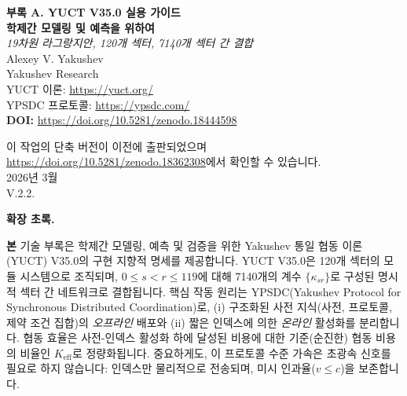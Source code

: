 \documentclass[13pt,a4paper]{article}
\newcommand{\Keff}{K_{\mathrm{eff}}}
\begin{document}
	
	\begin{titlepage}
		\begin{center}
			\vspace*{0.2cm}
			{\Huge\textbf{부록 A. 
					YUCT V35.0 실용 가이드\\
					학제간 모델링 및 예측을 위하여}}\\[0.8cm]
			
			{\Large\textit{19차원 라그랑지안, 120개 섹터, 7140개 섹터 간 결합}}\\[1.2cm]
			
			{\Large Alexey V. Yakushev}\\[0.3cm]
			{\large Yakushev Research}\\
			YUCT 이론: \url{https://yuct.org/}\\
			YPSDC 프로토콜: \url{https://ypsdc.com/}\\
			
			\vspace{2cm}
			\textbf{DOI:} \url{https://doi.org/10.5281/zenodo.18444598}\\
			
			\vspace{1cm}
			
			\vspace{0cm}
			\large 
			이 작업의 단축 버전이 이전에 출판되었으며\\ \url{https://doi.org/10.5281/zenodo.18362308}에서 확인할 수 있습니다.\\
			\vspace{1cm}
			2026년 3월 \\ \large V.2.2.
			
			\begin{minipage}{0.92\textwidth}
				\begin{center}\large\textbf{확장 초록.}\\
				\end{center}
				\large\textbf 본 기술 부록은 학제간 모델링, 예측 및 검증을 위한 Yakushev 통일 협동 이론(YUCT) V35.0의 구현 지향적 명세를 제공합니다. YUCT V35.0은 120개 섹터의 모듈 시스템으로 조직되며, $0\le s<r\le 119$에 대해 7140개의 계수 $\{\kappa_{sr}\}$로 구성된 명시적 섹터 간 네트워크로 결합됩니다. 핵심 작동 원리는 YPSDC(Yakushev Protocol for Synchronous Distributed Coordination)로, (i) 구조화된 사전 지식(사전, 프로토콜, 제약 조건 집합)의 \emph{오프라인} 배포와 (ii) 짧은 인덱스에 의한 \emph{온라인} 활성화를 분리합니다. 협동 효율은 사전-인덱스 활성화 하에 달성된 비용에 대한 기준(순진한) 협동 비용의 비율인 $\Keff$로 정량화됩니다. 중요하게도, 이 프로토콜 수준 가속은 초광속 신호를 필요로 하지 않습니다: 인덱스만 물리적으로 전송되며, 미시 인과율($v\le c$)을 보존합니다.
				

\end{minipage}
\end{center}
\end{titlepage}
\end{document}

